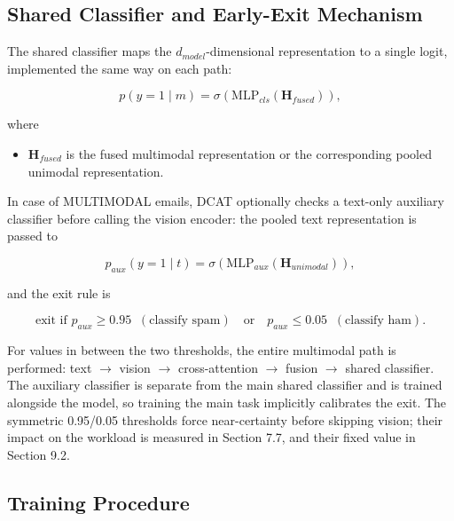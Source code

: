\documentclass[10pt,twoside]{article}
\begin{document}
\subsection{Shared Classifier and Early-Exit Mechanism}\label{sec:5.7}

The shared classifier maps the $d_{model}$-dimensional representation to a single logit, implemented the same way on each path:

\begin{equation}\label{eq:19}
p(y = 1 \mid m) = \sigma\! \left( \text{MLP}_{cls}(\mathbf{H}_{fused}) \right),
\end{equation}

where

\begin{itemize}[leftmargin=*,itemsep=1.5pt]
\item $\mathbf{H}_{fused}$ is the fused multimodal representation or the corresponding pooled unimodal representation.
\end{itemize}

In case of MULTIMODAL emails, DCAT optionally checks a text-only auxiliary classifier before calling the vision encoder: the pooled text representation is passed to

\begin{equation}\label{eq:20}
p_{aux}(y = 1 \mid t) = \sigma\! \left( \text{MLP}_{aux}(\mathbf{H}_{unimodal}) \right),
\end{equation}

and the exit rule is

\begin{equation}\label{eq:21}
\text{exit if } p_{aux} \geq 0.95 \;\;(\text{classify spam}) \quad \text{or} \quad p_{aux} \leq 0.05 \;\;(\text{classify ham}).
\end{equation}

For values in between the two thresholds, the entire multimodal path is performed: text $\rightarrow$ vision $\rightarrow$ cross-attention $\rightarrow$ fusion $\rightarrow$ shared classifier. The auxiliary classifier is separate from the main shared classifier and is trained alongside the model, so training the main task implicitly calibrates the exit. The symmetric 0.95/0.05 thresholds force near-certainty before skipping vision; their impact on the workload is measured in Section 7.7, and their fixed value in Section 9.2.

\subsection{Training Procedure}\label{sec:5.8}
\end{document}
